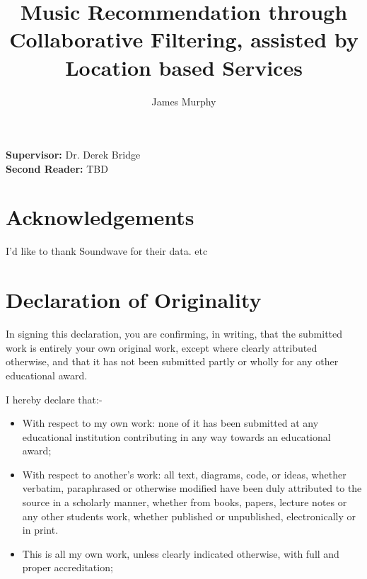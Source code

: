 \documentclass[12pt]{article}
\begin{document}
\begin{titlepage}

\title{Music Recommendation through Collaborative Filtering, assisted by Location based Services}

\author{James Murphy}


\maketitle
\vspace{4cm}
\begin{center}

\textbf{Supervisor: } Dr. Derek Bridge\\
\textbf{Second Reader:} TBD
\end{center}





\end{titlepage}

\pagebreak
\section*{Acknowledgements}
I'd like to thank Soundwave for their data. etc  
\pagebreak
\section*{Declaration of Originality}

In signing this declaration, you are confirming, in writing, that the submitted work is entirely your own original work, except where clearly attributed otherwise, and that it has not been submitted partly or wholly for any other educational award.

I hereby declare that:-
\begin{itemize}
\item With respect to my own work: none of it has been submitted at any
educational institution contributing in any way towards an educational
award; 

\item With respect to another’s work: all text, diagrams, code, or ideas,
whether verbatim, paraphrased or otherwise modified have
been duly attributed to the source in a scholarly manner, whether from
books, papers, lecture notes or any other students work, whether published or unpublished, electronically or in print.  

\item This is all my own work, unless clearly indicated otherwise, with full
and proper accreditation;



\end{itemize}
\end{document}
